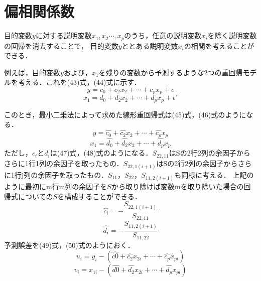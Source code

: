 \documentclass[dvipdfmx]{jsarticle}
\begin{document}
\section{偏相関係数}
目的変数$y$に対する説明変数$x_1,x_2\cdots, x_p$のうち，任意の説明変数$x_i$を除く説明変数の回帰を消去することで，
目的変数$y$ととある説明変数$x_i$の相関を考えることができる．
\par
例えば，目的変数$y$および，$x_1$を残りの変数から予測するような2つの重回帰モデルを考える．これを(43)式，(44)式に示す．
\begin{equation}
  y = c_0+c_2x_{2}+\cdots+c_px_{p}+\epsilon
\end{equation}
\begin{equation}
  x_1 = d_0+d_2x_{2}+\cdots+d_px_{p}+\epsilon'
\end{equation}

このとき，最小二乗法によって求めた線形重回帰式は(45)式，(46)式のようになる．
\begin{equation}
  y = \hat{c_0}+\hat{c_2}x_{2}+\cdots+\hat{c_p}x_{p}
\end{equation}
\begin{equation}
  x_{1} = \hat{d_0}+\hat{d_2}x_{2}+\cdots+\hat{d_p}x_{p}
\end{equation}
ただし，$c_i$と$d_i$は(47)式，(48)式のようになる．$S_{22,11}$はSの2行2列の余因子からさらに1行1列の余因子を取ったもの．$S_{22,1(i+1)}$はSの2行2列の余因子からさらに1行j列の余因子を取ったもの．$S_{11}，S_{22}，S_{11,2(i+1)}$も同様に考える．
上記のように最初にm行m列の余因子を$S$から取り除けば変数mを取り除いた場合の回帰式についての$S$を構成することができる．
\begin{equation}
  \hat{c_i}=-\frac{S_{22,1(i+1)}}{S_{22,11}}
\end{equation}
\begin{equation}
  \hat{d_i}=-\frac{S_{11,2(i+1)}}{S_{11,22}}
\end{equation}
予測誤差を(49)式，(50)式のようにおく．
\begin{equation}
  u_i=y_i-(\hat{c0}+\hat{c_2}x_{2i}+\cdots+\hat{c_p}x_{pi})
\end{equation}
\begin{equation}
  v_i=x_{1i}-(\hat{d0}+\hat{d_2}x_{2i}+\cdots+\hat{d_p}x_{pi})
\end{equation}
\end{document}

